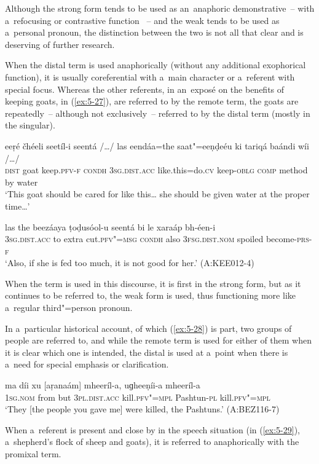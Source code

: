 Although the strong form tends to be used as an~anaphoric demonstrative~-- with a~refocusing or contrastive function \citep[432]{diessel2006}~-- and the weak tends to be used as a~personal pronoun, the distinction between the two is not all that clear and is deserving of further research.

When the distal term is used anaphorically (without any additional exophorical function), it is usually coreferential with a~main character or a~referent with special focus. Whereas the other referents, in an~exposé on the benefits of keeping goats, in (\ref{ex:5-27}), are referred to by the remote term, the goats are repeatedly~-- although not exclusively~-- referred to by the distal term (mostly in the singular). 

\begin{exe}
\ex
\label{ex:5-27}
\gll eeṛé čhéeli seetíl-i seentá /{\ldots}/ las eendáa=the saat"=eeṇḍeéu ki
tariqá baándi wíi /{\ldots}/ \\
\textsc{dist} goat keep.\textsc{pfv-f} \textsc{condh} {} \textsc{3sg.dist.acc} like.this=do.\textsc{cv} keep-\textsc{oblg} \textsc{comp} method by water\\
\glt `This goat should be cared for like this{\ldots} she should be given water at the proper time{\ldots}'

\gll las the beezáaya ṭoḍusóol-u seentá bi le xaraáp bh-éen-i \\
\textsc{3sg}.\textsc{dist.acc} to extra cut.\textsc{pfv"=msg} \textsc{condh} also
\textsc{3fsg}.\textsc{dist.nom} spoiled become-\textsc{prs-f} \\
\glt `Also, if she is fed too much, it is not good for her.' (A:KEE012-4)
\end{exe}
When the term is used in this discourse, it is first in the strong form, but as it continues to be referred to, the weak form is used, thus functioning more like a~regular third"=person pronoun.

In a~particular historical account, of which (\ref{ex:5-28}) is part, two groups of people are referred to, and while the remote term is used for either of them when it is clear which one is intended, the distal is used at a~point when there is a~need for special emphasis or clarification.

\begin{exe}
\ex
\label{ex:5-28}
\gll ma díi xu [aṛanaám] mheeríl-a, uɡheeṇíi-a mheeríl-a\\
\textsc{1sg}.\textsc{nom} from but \textsc{3pl.}\textsc{dist.acc} kill.\textsc{pfv"=mpl} Pashtun-\textsc{pl} kill.\textsc{pfv"=mpl}\\
\glt `They [the people you gave me] were killed, the Pashtuns.' (A:BEZ116-7)\\
\end{exe}
When a~referent is present and close by in the speech situation (in (\ref{ex:5-29}), a~shepherd's flock of sheep and goats), it is referred to anaphorically with the promixal term.

